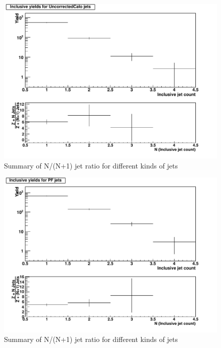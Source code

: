 \documentclass{cmspaper2}
\begin{document}
\begin{figure}[hbtp]
   \begin{center}
   \includegraphics[width=150mm]{FinalPlot_FloatAll_UncorrectedCalo}
   \caption{Summary of N/(N+1) jet ratio for different kinds of jets}
   \label{Figure_RatioFromDataUncorrectedCaloJet}
   \end{center}
\end{figure}

\begin{figure}[hbtp]
   \begin{center}
   \includegraphics[width=150mm]{FinalPlot_FloatAll_PF}
   \caption{Summary of N/(N+1) jet ratio for different kinds of jets}
   \label{Figure_RatioFromDataPFJet}
   \end{center}
\end{figure}
\end{document}
